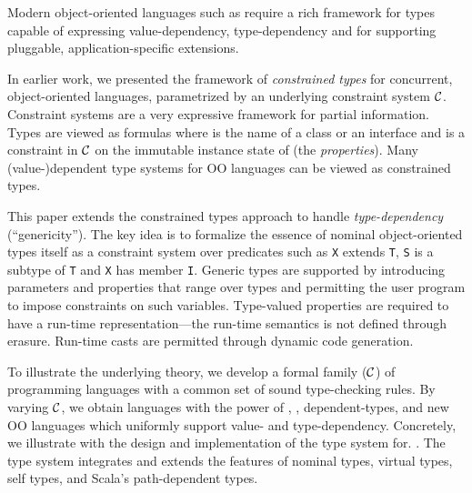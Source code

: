 
Modern object-oriented languages such as \Xten{} require a rich
framework for types capable of expressing value-dependency,
type-dependency and for supporting pluggable, application-specific
extensions.

In earlier work, we presented the framework of {\em constrained types}
for concurrent, object-oriented languages, parametrized by an
underlying constraint system $\cal C$. Constraint systems are a very
expressive framework for partial information. Types are viewed as
formulas  where  is the name of a class or an interface
and
 is a constraint in $\cal C$ on the immutable instance state of
 (the {\em properties}). Many (value-)dependent type systems
for OO languages can be viewed as constrained types.

This paper extends the constrained types approach to handle
{\em type-dependency} (``genericity''). The key idea is to formalize the
essence of nominal object-oriented types itself as a constraint system
over predicates such as {\tt X} extends {\tt T}, {\tt S} is a subtype
of {\tt T} and {\tt X} has member {\tt I}. Generic types are supported
by introducing parameters and properties that range over types and
permitting the user program to impose constraints on such
variables. Type-valued properties are required to have a run-time
representation---the run-time semantics is not defined through
erasure. Run-time casts are permitted through dynamic code generation.

To illustrate the underlying theory, we develop a formal family
\FX(${\cal C}$) of programming languages with a common set of sound
type-checking rules.  By varying $\cal C$, we obtain languages with
the power of \FJ, \FGJ, dependent-types, and new OO languages which
uniformly support value- and type-dependency.  Concretely, we
illustrate with the design and implementation of the type system for.
\Xten{}.  The type system integrates and extends the features of
nominal types, virtual types, self types, and Scala's path-dependent
types.
